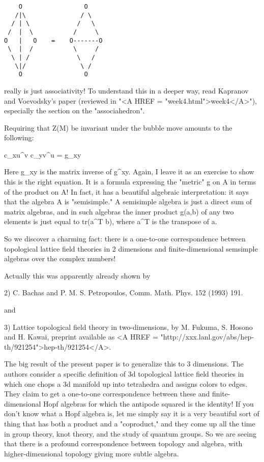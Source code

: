 \begin{verbatim}
    O                 O
   /|\               / \    
  / | \             /   \  
 /  |  \           /     \ 
O   |   O    =    O-------O
 \  |  /           \     /   
  \ | /             \   /          
   \|/               \ /     
    O                 O
\end{verbatim}
    

really is just associativity!  To understand this in a deeper way, read
Kapranov and Voevodsky's paper (reviewed in "<A HREF = "week4.html">week4</A>"), especially the
section on the "associahedron".  

Requiring that Z(M) be invariant under the bubble move amounts to the
following:

c_{xu}^v c_{yv}^u = g_{xy}

Here g_{xy} is the matrix inverse of g^{xy}.  Again, I leave it as an
exercise to show this is the right equation.  It is a formula expressing
the "metric" g on A in terms of the product on A!   In fact, it has a
beautiful algebraic interpretation: it says that the algebra A is
"semisimple."   A semisimple algebra is just a direct sum of matrix
algebras, and in such algebras the inner product g(a,b) of any two
elements is just equal to tr(a^T b), where a^T is the transpose of a.  

So we discover a charming fact: there is a one-to-one correspondence
between topological lattice field theories in 2 dimensions and
finite-dimensional semsimple algebras over the complex numbers!   

Actually this was apparently already shown by 

2) C. Bachas and P. M. S. Petropoulos, Comm. Math. Phys. 152 (1993) 191.

and

3) Lattice topological field theory in two-dimensions, by M. Fukuma, S.
Hosono and H. Kawai, preprint available as <A HREF = "http://xxx.lanl.gov/abs/hep-th/921254">hep-th/921254</A>.

The big result of the present paper is to generalize this to 3 dimensions.
The authors consider a specific definition of 3d topological lattice
field theories in which one chops a 3d manifold up into tetrahedra and
assigns colors to edges.  They claim to get a one-to-one correspondence 
between these and finite-dimensional Hopf algebras for which the
antipode squared is the identity!   If you don't know what a Hopf
algebra is, let me simply say it is a very beautiful sort of thing that
has both a product and a "coproduct," and they come up all the time in
group theory, knot theory, and the study of quantum groups.  So we are
seeing that there is a profound correspondence between topology and
algebra, with higher-dimensional topology giving more subtle algebra.

